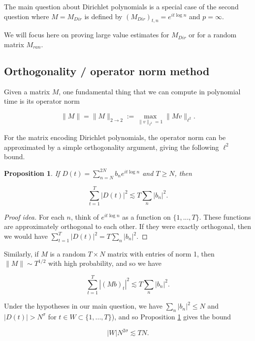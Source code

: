 \documentclass{amsart}
\newtheorem{prop}{Proposition}[section]
\begin{document}
The main question about Dirichlet polynomials is a special case of the second question where $M = M_{Dir}$ is defined by $(M_{Dir})_{t,n} = e^{i t \log n}$ and $p = \infty$.  

We will focus here on proving large value estimates for $M_{Dir}$ or for a random matrix $M_{ran}$.  



\subsection{Orthogonality / operator norm method}

Given a matrix $M$, one fundamental thing that we can compute in polynomial time is its operator norm

\begin{equation}
\| M \| = \| M \|_{2 \rightarrow 2 } := \max_{\| v \|_{\ell^2} = 1 } \| M v \|_{\ell^2}.
\end{equation}

For the matrix encoding Dirichlet polynomials, the operator norm can be approximated by a simple orthogonality argument, giving the following $\ell^2$ bound.

\begin{prop} \label{proporthintro} If $D(t) = \sum_{n=N}^{2 N} b_n e^{i t \log n}$ and $T \ge N$, then

$$ \sum_{t = 1}^T |D(t)|^2 \lesssim T \sum_n |b_n|^2. $$

\end{prop}

\begin{proof} [Proof idea] For each $n$, think of $e^{i t \log n}$ as a function on $\{1, ..., T \}$.  These functions are approximately orthogonal to each other.  If they were exactly orthogonal, then we would have $ \sum_{t = 1}^T |D(t)|^2 = T \sum_n |b_n|^2. $
\end{proof}

Similarly,  if $M$ is a random $T \times N$ matrix with entries of norm 1,  then $\| M \| \sim T^{1/2}$ with high probability,  and so we have

$$ \sum_{t = 1}^T | (Mb)_t |^2 \lesssim T \sum_n |b_n|^2. $$

Under the hypotheses in our main question,  we have $\sum_n |b_n|^2 \le N$ and $|D(t)| > N^\sigma$ for $t \in W \subset \{ 1, ..., T \}$),  and so Proposition \ref{proporthintro} gives the bound

\begin{equation} \label{basicorthintro}
|W| N^{2 \sigma} \lesssim T N.
\end{equation}
\end{document}
